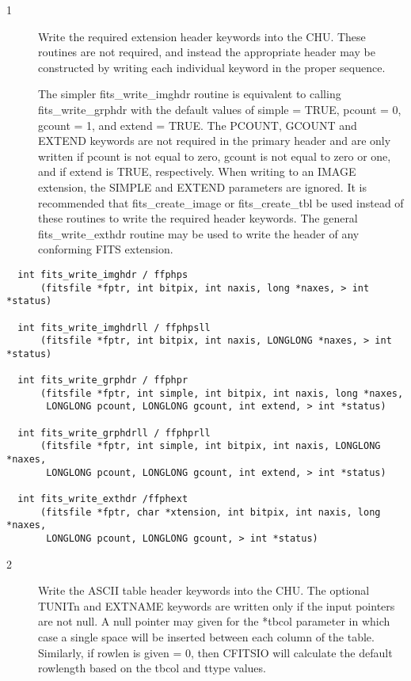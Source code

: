 \documentclass[11pt]{book}
\begin{document}
\begin{description}
\item[1 ] Write the required extension header keywords into the CHU.
  These routines are not required, and instead the appropriate
  header may be constructed by writing each individual keyword in the
  proper sequence.

  The simpler fits\_write\_imghdr routine is equivalent to calling
  fits\_write\_grphdr with the default values of simple = TRUE, pcount
  = 0, gcount = 1, and extend = TRUE.  The PCOUNT, GCOUNT and EXTEND
  keywords are not required in the primary header and are only written
  if pcount is not equal to zero, gcount is not equal to zero or one,
  and if extend is TRUE, respectively.  When writing to an IMAGE
  extension, the SIMPLE and EXTEND parameters are ignored.  It is
  recommended that fits\_create\_image or fits\_create\_tbl be used
  instead of these routines to write the
  required header keywords. The general fits\_write\_exthdr routine
  may be used to write the header of any conforming FITS
 extension.  \label{ffphpr} \label{ffphps}
\end{description}

\begin{verbatim}
  int fits_write_imghdr / ffphps
      (fitsfile *fptr, int bitpix, int naxis, long *naxes, > int *status)

  int fits_write_imghdrll / ffphpsll
      (fitsfile *fptr, int bitpix, int naxis, LONGLONG *naxes, > int *status)

  int fits_write_grphdr / ffphpr
      (fitsfile *fptr, int simple, int bitpix, int naxis, long *naxes,
       LONGLONG pcount, LONGLONG gcount, int extend, > int *status)

  int fits_write_grphdrll / ffphprll
      (fitsfile *fptr, int simple, int bitpix, int naxis, LONGLONG *naxes,
       LONGLONG pcount, LONGLONG gcount, int extend, > int *status)

  int fits_write_exthdr /ffphext
      (fitsfile *fptr, char *xtension, int bitpix, int naxis, long *naxes,
       LONGLONG pcount, LONGLONG gcount, > int *status)

\end{verbatim}

\begin{description}
\item[2 ] Write the ASCII table header keywords into the CHU.  The optional
    TUNITn and EXTNAME keywords are written only if the input pointers
    are not null.  A null pointer may given for the
    *tbcol parameter in which case a single space will be inserted
    between each column of the table.  Similarly, if rowlen is
    given = 0, then CFITSIO will calculate the default rowlength based on
   the tbcol and ttype values. \label{ffphtb}
\end{description}
\end{document}
